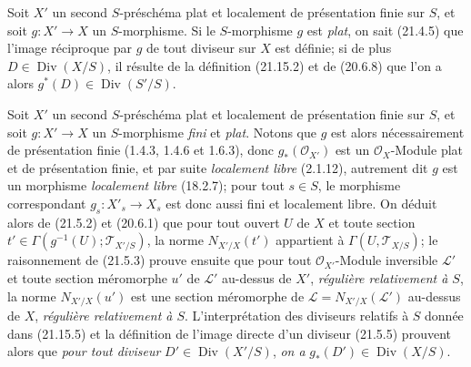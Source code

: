 \begin{env}[21.15.7]
\label{IV.21.15.7}
Soit $X'$ un second $S$-préschéma plat et localement de présentation finie sur $S$, et
soit $g:X'\to X$ un $S$-morphisme. Si le $S$-morphisme $g$ est \emph{plat}, on sait
(21.4.5) que l'image réciproque par $g$ de tout diviseur sur $X$ est définie; si de
plus $D\in\operatorname{Div}(X/S)$, il résulte de la définition (21.15.2) et de
(20.6.8) que l'on a alors $g^*(D)\in\operatorname{Div}(S'/S)$.
\end{env}

\begin{env}[21.15.8]
\label{IV.21.15.8}
Soit $X'$ un second $S$-préschéma plat et localement de présentation finie sur $S$, et
soit $g:X'\to X$ un $S$-morphisme \emph{fini} et \emph{plat}. Notons que $g$ est alors
nécessairement de présentation finie (1.4.3, 1.4.6 et 1.6.3), donc
$g_*(\mathcal O_{X'})$ est un $\mathcal O_X$-Module plat et de présentation finie, et
par suite \emph{localement libre} (2.1.12), autrement dit $g$ est un morphisme
\emph{localement libre} (18.2.7); pour tout $s\in S$, le morphisme correspondant
$g_s:X'_s\to X_s$ est donc aussi fini et localement libre. On déduit alors de (21.5.2)
et (20.6.1) que pour tout ouvert $U$ de $X$ et toute section
$t'\in\Gamma(g^{-1}(U);\mathscr T_{X'/S})$, la norme $N_{X'/X}(t')$ appartient à
$\Gamma(U,\mathscr T_{X/S})$; le raisonnement de (21.5.3) prouve ensuite que pour tout
$\mathcal O_{X'}$-Module inversible $\mathscr L'$ et toute section méromorphe $u'$ de
$\mathscr L'$ au-dessus de $X'$, \emph{régulière relativement à $S$}, la norme
$N_{X'/X}(u')$ est une section méromorphe de
$\mathscr L=N_{X'/X}(\mathscr L')$ au-dessus de $X$, \emph{régulière relativement à $S$}.
L'interprétation des diviseurs relatifs à $S$ donnée dans (21.15.5) et la définition de
l'image directe d'un diviseur (21.5.5) prouvent alors que \emph{pour tout diviseur}
$D'\in\operatorname{Div}(X'/S)$, \emph{on a} $g_*(D')\in\operatorname{Div}(X/S)$.
\end{env}

